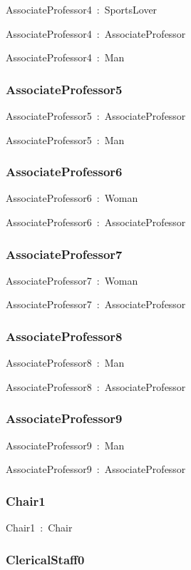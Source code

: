 \documentclass{article}
\begin{document}
AssociateProfessor4~:~SportsLover

AssociateProfessor4~:~AssociateProfessor

AssociateProfessor4~:~Man

\subsubsection*{AssociateProfessor5}

AssociateProfessor5~:~AssociateProfessor

AssociateProfessor5~:~Man

\subsubsection*{AssociateProfessor6}

AssociateProfessor6~:~Woman

AssociateProfessor6~:~AssociateProfessor

\subsubsection*{AssociateProfessor7}

AssociateProfessor7~:~Woman

AssociateProfessor7~:~AssociateProfessor

\subsubsection*{AssociateProfessor8}

AssociateProfessor8~:~Man

AssociateProfessor8~:~AssociateProfessor

\subsubsection*{AssociateProfessor9}

AssociateProfessor9~:~Man

AssociateProfessor9~:~AssociateProfessor

\subsubsection*{Chair1}

Chair1~:~Chair

\subsubsection*{ClericalStaff0}
\end{document}
